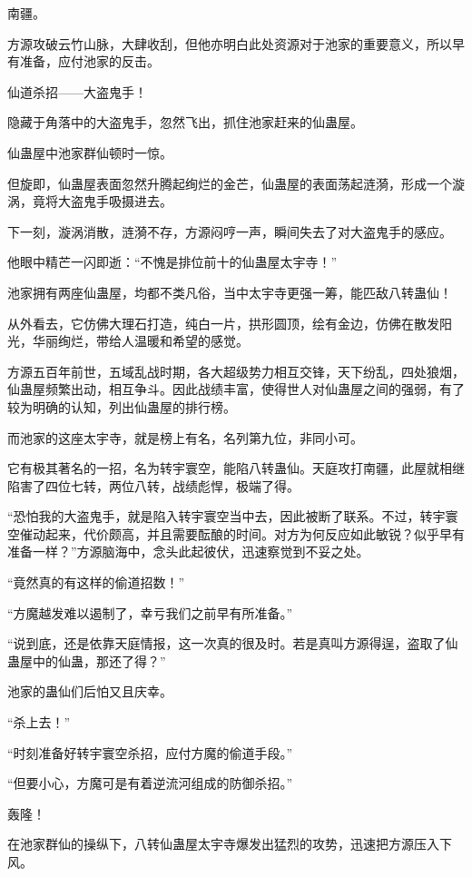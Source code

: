 
\begin{this_body}

南疆。

方源攻破云竹山脉，大肆收刮，但他亦明白此处资源对于池家的重要意义，所以早有准备，应付池家的反击。

仙道杀招——大盗鬼手！

隐藏于角落中的大盗鬼手，忽然飞出，抓住池家赶来的仙蛊屋。

仙蛊屋中池家群仙顿时一惊。

但旋即，仙蛊屋表面忽然升腾起绚烂的金芒，仙蛊屋的表面荡起涟漪，形成一个漩涡，竟将大盗鬼手吸摄进去。

下一刻，漩涡消散，涟漪不存，方源闷哼一声，瞬间失去了对大盗鬼手的感应。

他眼中精芒一闪即逝：“不愧是排位前十的仙蛊屋太宇寺！”

池家拥有两座仙蛊屋，均都不类凡俗，当中太宇寺更强一筹，能匹敌八转蛊仙！

从外看去，它仿佛大理石打造，纯白一片，拱形圆顶，绘有金边，仿佛在散发阳光，华丽绚烂，带给人温暖和希望的感觉。

方源五百年前世，五域乱战时期，各大超级势力相互交锋，天下纷乱，四处狼烟，仙蛊屋频繁出动，相互争斗。因此战绩丰富，使得世人对仙蛊屋之间的强弱，有了较为明确的认知，列出仙蛊屋的排行榜。

而池家的这座太宇寺，就是榜上有名，名列第九位，非同小可。

它有极其著名的一招，名为转宇寰空，能陷八转蛊仙。天庭攻打南疆，此屋就相继陷害了四位七转，两位八转，战绩彪悍，极端了得。

“恐怕我的大盗鬼手，就是陷入转宇寰空当中去，因此被断了联系。不过，转宇寰空催动起来，代价颇高，并且需要酝酿的时间。对方为何反应如此敏锐？似乎早有准备一样？”方源脑海中，念头此起彼伏，迅速察觉到不妥之处。

“竟然真的有这样的偷道招数！”

“方魔越发难以遏制了，幸亏我们之前早有所准备。”

“说到底，还是依靠天庭情报，这一次真的很及时。若是真叫方源得逞，盗取了仙蛊屋中的仙蛊，那还了得？”

池家的蛊仙们后怕又且庆幸。

“杀上去！”

“时刻准备好转宇寰空杀招，应付方魔的偷道手段。”

“但要小心，方魔可是有着逆流河组成的防御杀招。”

轰隆！

在池家群仙的操纵下，八转仙蛊屋太宇寺爆发出猛烈的攻势，迅速把方源压入下风。


\end{this_body}
